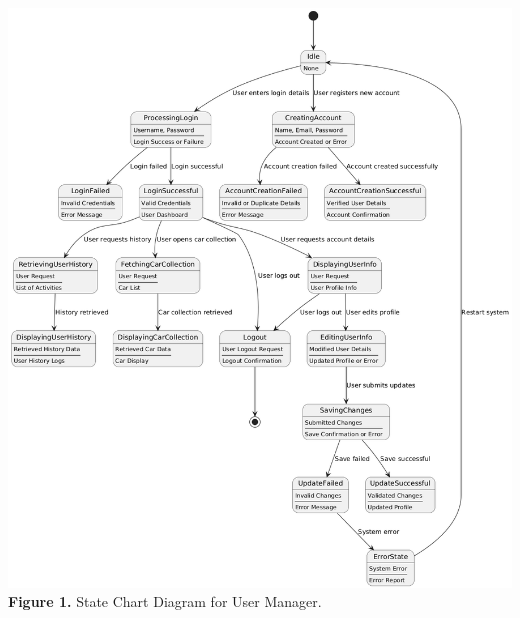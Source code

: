 \documentclass[]{article}
\begin{document}
\begin{center}
	\includegraphics[scale=0.5]{State Diagrams/omar_diagram.png}\\
	\textbf{Figure 1.} State Chart Diagram for User Manager.\\


\end{center}
\end{document}
